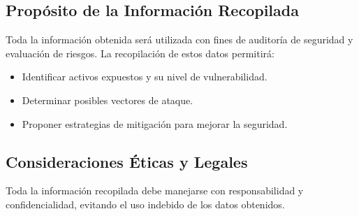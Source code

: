 \subsection{Propósito de la Información Recopilada}
Toda la información obtenida será utilizada con fines de auditoría de seguridad y evaluación de riesgos. La recopilación de estos datos permitirá:
\begin{itemize}
    \item Identificar activos expuestos y su nivel de vulnerabilidad.
    \item Determinar posibles vectores de ataque.
    \item Proponer estrategias de mitigación para mejorar la seguridad.
\end{itemize}

\subsection{Consideraciones Éticas y Legales}
Toda la información recopilada debe manejarse con responsabilidad y confidencialidad, evitando el uso indebido de los datos obtenidos.